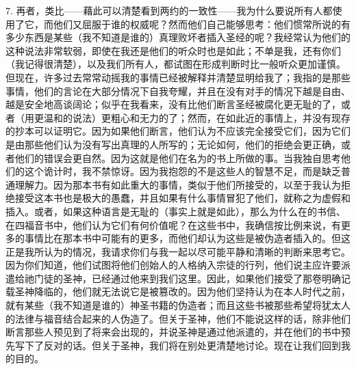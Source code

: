 7. 再者，类比——藉此可以清楚看到两约的一致性——我为什么要说所有人都使用了它，而他们又屈服于谁的权威呢？然而他们自己能够思考：他们惯常所说的有多少东西是某些（我不知道是谁的）真理败坏者插入圣经的呢？我经常认为他们的这种说法非常软弱，即使在我还是他们的听众时也是如此；不单是我，还有你们（我记得很清楚），以及我们所有人，都试图在形成判断时比一般听众更加谨慎。但现在，许多过去常常动摇我的事情已经被解释并清楚显明给我了；我指的是那些事情，他们的言论在大部分情况下自我夸耀，并且在没有对手的情况下越是自由、越是安全地高谈阔论；似乎在我看来，没有比他们断言圣经被腐化更无耻的了，或者（用更温和的说法）更粗心和无力的了；然而，在如此近的事情上，并没有现存的抄本可以证明它。因为如果他们断言，他们认为不应该完全接受它们，因为它们是由那些他们认为没有写出真理的人所写的；无论如何，他们的拒绝会更正确，或者他们的错误会更自然。因为这就是他们在名为的书上所做的事。当我独自思考他们的这个诡计时，我不禁惊讶。因为我抱怨的不是这些人的智慧不足，而是缺乏普通理解力。因为那本书有如此重大的事情，类似于他们所接受的，以至于我认为拒绝接受这本书也是极大的愚蠢，并且如果有什么事情冒犯了他们，就称之为虚假和插入。或者，如果这种语言是无耻的（事实上就是如此），那么为什么在的书信、在四福音书中，他们认为它们有何价值呢？在这些书中，我确信按比例来说，有更多的事情比在那本书中可能有的更多，而他们却认为这些是被伪造者插入的。但这正是我所认为的情况，我请求你们与我一起以尽可能平静和清晰的判断来思考它。因为你们知道，他们试图将他们创始人的人格纳入宗徒的行列，他们说主应许要派遣给祂门徒的圣神，已经通过他来到我们这里。因此，如果他们接受了那卷明确记载圣神降临的，他们就无法说它是被篡改的。因为他们坚持认为在本人时代之前，就有某些（我不知道是谁的）神圣书籍的伪造者；而且这些书被那些希望将犹太人的法律与福音结合起来的人伪造了。但关于圣神，他们不能说这样的话，除非他们断言那些人预见到了将来会出现的，并说圣神是通过他派遣的，并在他们的书中预先写下了反对的话。但关于圣神，我们将在别处更清楚地讨论。现在让我们回到我的目的。\par

